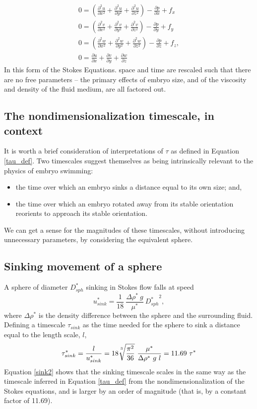 \documentclass[10pt,a4paper]{article}
\def\non{\nonumber}
\def\p{\partial}
\begin{document}
\begin{eqnarray}\label{Stokes2}
	0 = \left( \frac{\p^2 u}{\p x^2}+\frac{\p^2 u}{\p y^2}+\frac{\p^2 u}{\p z^2} \right) - \frac{\p p}{\p x} + f_x \non \\
	0 = \left( \frac{\p^2 v}{\p x^2}+\frac{\p^2 v}{\p y^2}+\frac{\p^2 v}{\p z^2} \right) - \frac{\p p}{\p y} + f_y \non \\
	0 = \left( \frac{\p^2 w}{\p x^2}+\frac{\p^2 w}{\p y^2}+\frac{\p^2 w}{\p z^2} \right) - \frac{\p p}{\p z} + f_z , \non \\
	0 =  \frac{\p u}{\p {x}}+\frac{\p v}{\p {y}}+\frac{\p w}{\p {z}}
\end{eqnarray}
In this form of the Stokes Equations. space and time are rescaled such that there are no free parameters -- the primary effects of embryo size, and of the viscosity and density of the fluid medium, are all factored out.  

\subsection{The nondimensionalization timescale, in context}
It is worth a brief consideration of interpretations of $\tau$ as defined in Equation \ref{tau_def}.
Two timescales suggest themselves as being intrinsically relevant to the physics of embryo swimming:
\begin{itemize}
	\item the time over which an embryo sinks a distance equal to its own size; and,
	\item the time over which an embryo rotated away from its stable orientation reorients to approach its stable orientation.
\end{itemize}
We can get a sense for the magnitudes of these timescales, without introducing unnecessary parameters, by considering the equivalent sphere.

\subsection{Sinking movement of a sphere}\label{SinkSect}
A sphere of diameter $D_{sph}^*$ sinking in Stokes flow falls at speed
 \begin{equation}\label{sink1}
 	u_{sink}^* = \frac{1}{18} ~ \frac{\Delta \rho^* ~ g}{\mu^*}  ~ {D_{sph}^*}^2,
 \end{equation}
where $\Delta \rho^*$ is the density difference between the sphere and the surrounding fluid.
Defining a timescale $\tau_{sink}$ as the time needed for the sphere to sink a distance equal to the length scale, $l$,
\begin{equation}\label{sink2}
	\tau^*_{sink} = \frac{l}{u_{sink}^*} = 18 \sqrt[\uproot{5}3]{\frac{\pi^2}{36}} ~ \frac{\mu^*}{\Delta \rho^* ~ g ~ l} 
	              = 11.69 ~ \tau^*
\end{equation}
Equation \ref{sink2} shows that the sinking timescale scales in the same way as the timescale inferred in Equation \ref{tau_def} from the nondimensionalization of the Stokes equations, and is larger by an order of magnitude (that is, by a constant factor of 11.69).
\end{document}
